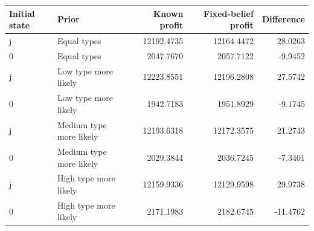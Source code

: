 \begin{tabular}{llrrr}\hline
Initial state & Prior & Known profit & Fixed-belief profit & Difference\\\hline
j & Equal types & 12192.4735 & 12164.4472 & 28.0263 \\
0 & Equal types & 2047.7670 & 2057.7122 & -9.9452 \\
j & Low type more likely & 12223.8551 & 12196.2808 & 27.5742 \\
0 & Low type more likely & 1942.7183 & 1951.8929 & -9.1745 \\
j & Medium type more likely & 12193.6318 & 12172.3575 & 21.2743 \\
0 & Medium type more likely & 2029.3844 & 2036.7245 & -7.3401 \\
j & High type more likely & 12159.9336 & 12129.9598 & 29.9738 \\
0 & High type more likely & 2171.1983 & 2182.6745 & -11.4762 \\
\hline\end{tabular}

